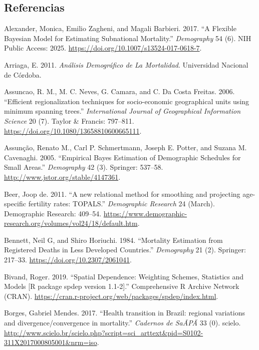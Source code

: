 \documentclass[12pt,]{article}
\begin{document}
\hypertarget{referencias}{%
\subsection*{Referencias}\label{referencias}}

\hypertarget{refs}{}
\leavevmode\hypertarget{ref-Alexander2017}{}%
Alexander, Monica, Emilio Zagheni, and Magali Barbieri. 2017. ``A
Flexible Bayesian Model for Estimating Subnational Mortality.''
\emph{Demography} 54 (6). NIH Public Access: 2025.
\url{https://doi.org/10.1007/s13524-017-0618-7}.

\leavevmode\hypertarget{ref-Arriaga2011}{}%
Arriaga, E. 2011. \emph{Análisis Demográfico de La Mortalidad}.
Universidad Nacional de Córdoba.

\leavevmode\hypertarget{ref-AssunCao2006}{}%
Assuncao, R. M., M. C. Neves, G. Camara, and C. Da Costa Freitas. 2006.
``Efficient regionalization techniques for socio-economic geographical
units using minimum spanning trees.'' \emph{International Journal of
Geographical Information Science} 20 (7). Taylor \& Francis: 797--811.
\url{https://doi.org/10.1080/13658810600665111}.

\leavevmode\hypertarget{ref-Assuncao2005}{}%
Assunção, Renato M., Carl P. Schmertmann, Joseph E. Potter, and Suzana
M. Cavenaghi. 2005. ``Empirical Bayes Estimation of Demographic
Schedules for Small Areas.'' \emph{Demography} 42 (3). Springer:
537--58. \url{http://www.jstor.org/stable/4147361}.

\leavevmode\hypertarget{ref-deBeer2011}{}%
Beer, Joop de. 2011. ``A new relational method for smoothing and
projecting age-specific fertility rates: TOPALS.'' \emph{Demographic
Research} 24 (March). Demographic Research: 409--54.
\url{https://www.demographic-research.org/volumes/vol24/18/default.htm}.

\leavevmode\hypertarget{ref-Bennett_Horiuchi_1984}{}%
Bennett, Neil G, and Shiro Horiuchi. 1984. ``Mortality Estimation from
Registered Deaths in Less Developed Countries.'' \emph{Demography} 21
(2). Springer: 217--33. \url{https://doi.org/10.2307/2061041}.

\leavevmode\hypertarget{ref-Bivand2019}{}%
Bivand, Roger. 2019. ``Spatial Dependence: Weighting Schemes, Statistics
and Models {[}R package spdep version 1.1-2{]}.'' Comprehensive R
Archive Network (CRAN).
\url{https://cran.r-project.org/web/packages/spdep/index.html}.

\leavevmode\hypertarget{ref-Borges2017}{}%
Borges, Gabriel Mendes. 2017. ``Health transition in Brazil: regional
variations and divergence/convergence in mortality.'' \emph{Cadernos de
SaÃPÃ} 33 (0). scielo.
\url{http://www.scielo.br/scielo.php?script=sci_arttext\&pid=S0102-311X2017000805001\&nrm=iso}.
\end{document}
